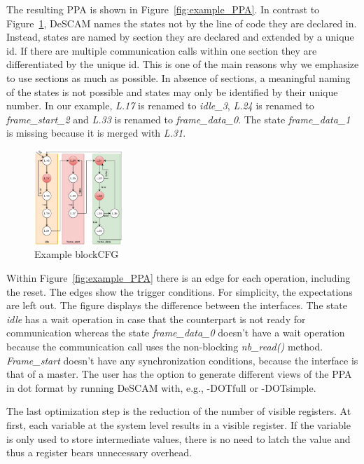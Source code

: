 The resulting PPA is shown in Figure~\ref{fig:example_PPA}. 
In contrast to Figure~\ref{fig:cfg_colored}, DeSCAM names the states not by the line of code they are declared in. 
Instead, states are named by section they are declared and extended by a unique id. 
If there are multiple communication calls within one section they are differentiated by the unique id. 
This is one of the main reasons why we emphasize to use sections as much as possible. 
In absence of sections, a meaningful naming of the states is not possible and states may only be identified by their unique number. 
In our example, \textit{L.17} is renamed to \textit{idle\_3}, \textit{L.24} is renamed to \textit{frame\_start\_2} and \textit{L.33} is renamed to \textit{frame\_data\_0}. The state \textit{frame\_data\_1} is missing because it is merged with \textit{L.31}.

\begin{figure}
	\vspace{-20pt}
    \caption{Example blockCFG}
    \label{fig:cfg_colored}
    \includegraphics[width=0.3\textwidth]{fig/example_cfg_colored.pdf}
    \vspace{-20pt}
\end{figure}

Within Figure~\ref{fig:example_PPA} there is an edge for each operation, including the reset. 
The edges show the trigger conditions. For simplicity, the expectations are left out. 
The figure displays the difference between the interfaces. 
The state \textit{idle} has a wait operation in case that the counterpart is not ready for communication whereas the state \textit{frame\_data\_0} doesn't have a wait operation because the communication call uses the non-blocking \textit{nb\_read()} method. 
\textit{Frame\_start} doesn't have any synchronization conditions, because the interface is that of a master.  
The user has the option to generate different views of the PPA in dot format by running DeSCAM with, e.g., -DOTfull or -DOTsimple.  

The last optimization step is the reduction of the number of visible registers. 
At first, each variable at the system level results in a visible register. 
If the variable is only used to store intermediate values, there is no need to latch the value and thus a register bears unnecessary overhead. 

